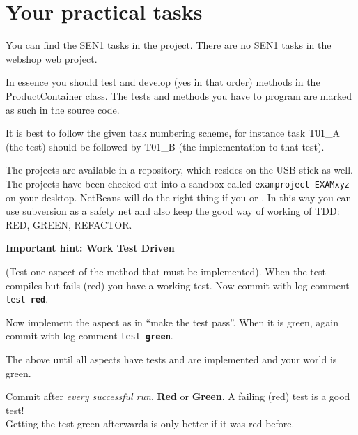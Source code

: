 \section{Your practical tasks}
You can find the SEN1 tasks in the  project.
There are no SEN1 tasks in the webshop web project.

In essence you should test and develop (yes in that order) 
methods in the ProductContainer class. The tests and methods
you have to program are marked as such in the source code.

It is best to follow the given task numbering scheme, for instance task
T01\_A (the test) should be followed by T01\_B (the implementation
to that test).

The projects are available in a repository, which resides on the USB
stick as well. The projects have been checked out into a sandbox called
\texttt{examproject-EXAMxyz} on your desktop. NetBeans will do the right thing
if you  or . In this way you can
use subversion as a safety net and also keep the good way of working
of TDD: RED, GREEN, REFACTOR. 

\begin{center}
  {\bf\sffamily Important hint: Work Test Driven}
\end{center}

\begin{description*}
\item [Develop a test:] (Test one aspect of the method that must be
  implemented). When the test compiles but fails (red) you have a
  working test. Now commit with  log-comment \texttt{test {\bfseries\color{BrickRed}red}}.
  
\item[Implement an aspect:] Now implement the aspect as in ``make the test
  pass''. When it is green, again commit with  log-comment
  \texttt{test {\bfseries\color{OliveGreen}green}}.
\item[Repeat:] The above until all aspects have tests and are implemented
  and your world is green.
\end{description*}

\begin{center}
  {\large\sffamily{}Commit after \textit{every successful run},  \textbf{Red} or
    \textbf{Green}. A failing (red) test is a good test!\\Getting the test green
    afterwards is only better if it was red before.}
\end{center}

